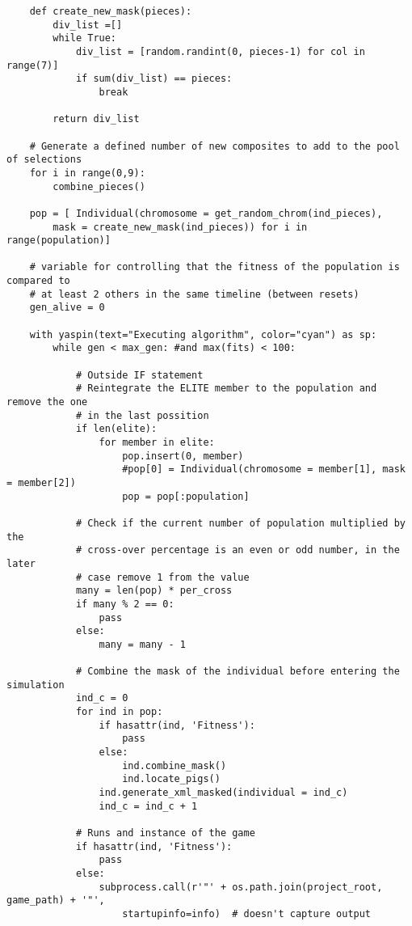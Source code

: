 \begin{verbatim}
    def create_new_mask(pieces):
        div_list =[]
        while True:
            div_list = [random.randint(0, pieces-1) for col in range(7)]
            if sum(div_list) == pieces:
                break
        
        return div_list

    # Generate a defined number of new composites to add to the pool of selections
    for i in range(0,9):
        combine_pieces()

    pop = [ Individual(chromosome = get_random_chrom(ind_pieces), 
        mask = create_new_mask(ind_pieces)) for i in range(population)]
    
    # variable for controlling that the fitness of the population is compared to 
    # at least 2 others in the same timeline (between resets)
    gen_alive = 0  

    with yaspin(text="Executing algorithm", color="cyan") as sp: 
        while gen < max_gen: #and max(fits) < 100:
                    
            # Outside IF statement
            # Reintegrate the ELITE member to the population and remove the one 
            # in the last possition
            if len(elite):
                for member in elite:
                    pop.insert(0, member)
                    #pop[0] = Individual(chromosome = member[1], mask = member[2])
                    pop = pop[:population]

            # Check if the current number of population multiplied by the 
            # cross-over percentage is an even or odd number, in the later 
            # case remove 1 from the value
            many = len(pop) * per_cross
            if many % 2 == 0:
                pass
            else:
                many = many - 1

            # Combine the mask of the individual before entering the simulation
            ind_c = 0
            for ind in pop:
                if hasattr(ind, 'Fitness'):
                    pass
                else:
                    ind.combine_mask()
                    ind.locate_pigs()
                ind.generate_xml_masked(individual = ind_c)
                ind_c = ind_c + 1
            
            # Runs and instance of the game
            if hasattr(ind, 'Fitness'):
                pass
            else:
                subprocess.call(r'"' + os.path.join(project_root, game_path) + '"', 
                    startupinfo=info)  # doesn't capture output


\end{verbatim}
